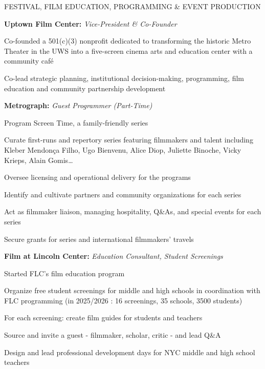 \begin{rubric}{FESTIVAL, FILM EDUCATION, PROGRAMMING \& EVENT PRODUCTION}

  \entry*[2024-present]%
  \textbf{Uptown Film Center:} \textit{Vice-President \& Co-Founder}
  \par
  \begin{cvitems}
    \item Co-founded a 501(c)(3) nonprofit dedicated to transforming the historic Metro Theater
      in the UWS into a five-screen cinema arts and education center with a community caf\'e
    \item Co-lead strategic planning, institutional decision-making, programming, film education
      and community partnership development
  \end{cvitems}

  \entry*[2022-present]%
  \textbf{Metrograph:} \textit{Guest Programmer (Part-Time)}
  \par
  \begin{cvitems}
    \item Program Screen Time, a family-friendly series
    \item Curate first-runs and repertory series featuring filmmakers and talent including
      Kleber Mendon\c{c}a Filho, Ugo Bienvenu, Alice Diop, Juliette Binoche, Vicky Krieps,
      Alain Gomis\ldots
    \item Oversee licensing and operational delivery for the programs
    \item Identify and cultivate partners and community organizations for each series
    \item Act as filmmaker liaison, managing hospitality, Q\&As, and special events for each
      series
    \item Secure grants for series and international filmmakers' travels
  \end{cvitems}

  \entry*[2023-present]%
  \textbf{Film at Lincoln Center:} \textit{Education Consultant, Student Screenings}
  \par
  \begin{cvitems}
    \item Started FLC's film education program
    \item Organize free student screenings for middle and high schools in coordination with FLC
      programming (in 2025/2026 : 16 screenings, 35 schools, 3500 students)
    \item For each screening: create film guides for students and teachers
    \item Source and invite a guest - filmmaker, scholar, critic - and lead Q\&A
    \item Design and lead professional development days for NYC middle and high school teachers
  \end{cvitems}


\end{rubric}
